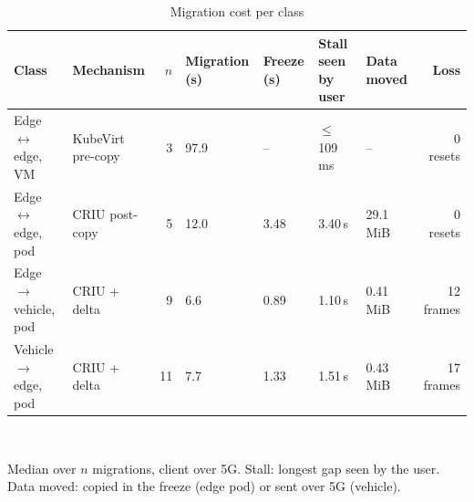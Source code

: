 \begin{table}[t]
\centering
\caption{Migration cost per class}
\label{tab:migration_cost}
\footnotesize
\setlength{\tabcolsep}{4pt}
\begin{tabular}{llrllllr}
\toprule
Class & Mechanism & $n$ & Migration (s) & Freeze (s) & Stall seen by user & Data moved & Loss \\
\midrule
Edge$\leftrightarrow$edge, VM & KubeVirt pre-copy & 3 & 97.9 & -- & $\le$109\,ms & -- & 0 resets \\
Edge$\leftrightarrow$edge, pod & CRIU post-copy & 5 & 12.0 & 3.48 & 3.40\,s & 29.1 MiB & 0 resets \\
Edge$\rightarrow$vehicle, pod & CRIU + delta & 9 & 6.6 & 0.89 & 1.10\,s & 0.41 MiB & 12 frames \\
Vehicle$\rightarrow$edge, pod & CRIU + delta & 11 & 7.7 & 1.33 & 1.51\,s & 0.43 MiB & 17 frames \\
\bottomrule
\end{tabular}
\\[3pt]\parbox{\textwidth}{\footnotesize Median over $n$ migrations, client over 5G. Stall: longest gap seen by the user. Data moved: copied in the freeze (edge pod) or sent over 5G (vehicle).}
\end{table}
